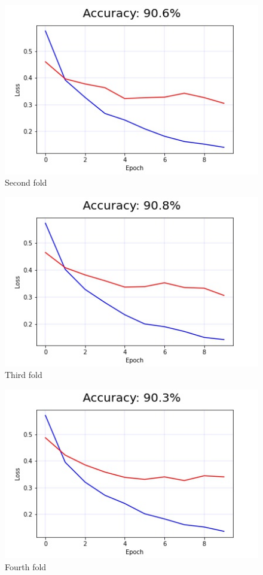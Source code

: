 \documentclass[11pt]{article}
\begin{document}
\begin{figure}[H]
    \centerline{\includegraphics[scale=.5]{image2.jpg}}
    \caption{Second fold}
    \label{fig}
\end{figure}

\begin{figure}[H]
    \centerline{\includegraphics[scale=.5]{image3.jpg}}
    \caption{Third fold}
    \label{fig}
\end{figure}

\begin{figure}[H]
    \centerline{\includegraphics[scale=.5]{image4.jpg}}
    \caption{Fourth fold}
    \label{fig}
\end{figure}
\end{document}
